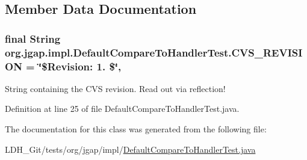 \subsection{Member Data Documentation}
\hypertarget{classorg_1_1jgap_1_1impl_1_1_default_compare_to_handler_test_ad73b764cc0b05011eea331a92af4de88}{
\subsubsection[{C\-V\-S\-\_\-\-R\-E\-V\-I\-S\-I\-O\-N}]{\setlength{\rightskip}{0pt plus 5cm}final String org.\-jgap.\-impl.\-Default\-Compare\-To\-Handler\-Test.\-C\-V\-S\-\_\-\-R\-E\-V\-I\-S\-I\-O\-N = \char`\"{}\$Revision\-: 1. \$\char`\"{}\hspace{0.3cm}{\ttfamily [static]}, {\ttfamily [private]}}}\label{classorg_1_1jgap_1_1impl_1_1_default_compare_to_handler_test_ad73b764cc0b05011eea331a92af4de88}
String containing the C\-V\-S revision. Read out via reflection! 

Definition at line 25 of file Default\-Compare\-To\-Handler\-Test.\-java.



The documentation for this class was generated from the following file\-:\begin{DoxyCompactItemize}
\item 
L\-D\-H\-\_\-\-Git/tests/org/jgap/impl/\hyperlink{_default_compare_to_handler_test_8java}{Default\-Compare\-To\-Handler\-Test.\-java}\end{DoxyCompactItemize}

